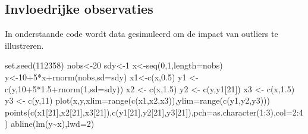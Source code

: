 \documentclass[
  dutch,
  letterpaper,
  12pt]{book}
\newenvironment{Shaded}{\begin{snugshade}}{\end{snugshade}}
\newcommand{\AttributeTok}[1]{\textcolor[rgb]{0.40,0.45,0.13}{#1}}
\newcommand{\DecValTok}[1]{\textcolor[rgb]{0.68,0.00,0.00}{#1}}
\newcommand{\FloatTok}[1]{\textcolor[rgb]{0.68,0.00,0.00}{#1}}
\newcommand{\FunctionTok}[1]{\textcolor[rgb]{0.28,0.35,0.67}{#1}}
\newcommand{\NormalTok}[1]{\textcolor[rgb]{0.00,0.23,0.31}{#1}}
\newcommand{\OtherTok}[1]{\textcolor[rgb]{0.00,0.23,0.31}{#1}}
\newcommand{\SpecialCharTok}[1]{\textcolor[rgb]{0.37,0.37,0.37}{#1}}
\theoremstyle{definition}
\theoremstyle{definition}
\theoremstyle{definition}
\theoremstyle{remark}
\begin{document}
\subsection{Invloedrijke observaties}\label{invloedrijke-observaties}

In onderstaande code wordt data gesimuleerd om de impact van outliers te
illustreren.

\begin{Shaded}
\begin{Highlighting}[]
\FunctionTok{set.seed}\NormalTok{(}\DecValTok{112358}\NormalTok{)}
\NormalTok{nobs}\OtherTok{\textless{}{-}}\DecValTok{20}
\NormalTok{sdy}\OtherTok{\textless{}{-}}\DecValTok{1}
\NormalTok{x}\OtherTok{\textless{}{-}}\FunctionTok{seq}\NormalTok{(}\DecValTok{0}\NormalTok{,}\DecValTok{1}\NormalTok{,}\AttributeTok{length=}\NormalTok{nobs)}
\NormalTok{y}\OtherTok{\textless{}{-}}\DecValTok{10}\SpecialCharTok{+}\DecValTok{5}\SpecialCharTok{*}\NormalTok{x}\SpecialCharTok{+}\FunctionTok{rnorm}\NormalTok{(nobs,}\AttributeTok{sd=}\NormalTok{sdy)}
\NormalTok{x1}\OtherTok{\textless{}{-}}\FunctionTok{c}\NormalTok{(x,}\FloatTok{0.5}\NormalTok{)}
\NormalTok{y1 }\OtherTok{\textless{}{-}} \FunctionTok{c}\NormalTok{(y,}\DecValTok{10}\SpecialCharTok{+}\DecValTok{5}\SpecialCharTok{*}\FloatTok{1.5}\SpecialCharTok{+}\FunctionTok{rnorm}\NormalTok{(}\DecValTok{1}\NormalTok{,}\AttributeTok{sd=}\NormalTok{sdy))}
\NormalTok{x2 }\OtherTok{\textless{}{-}} \FunctionTok{c}\NormalTok{(x,}\FloatTok{1.5}\NormalTok{)}
\NormalTok{y2 }\OtherTok{\textless{}{-}} \FunctionTok{c}\NormalTok{(y,y1[}\DecValTok{21}\NormalTok{])}
\NormalTok{x3 }\OtherTok{\textless{}{-}} \FunctionTok{c}\NormalTok{(x,}\FloatTok{1.5}\NormalTok{)}
\NormalTok{y3 }\OtherTok{\textless{}{-}} \FunctionTok{c}\NormalTok{(y,}\DecValTok{11}\NormalTok{)}
\FunctionTok{plot}\NormalTok{(x,y,}\AttributeTok{xlim=}\FunctionTok{range}\NormalTok{(}\FunctionTok{c}\NormalTok{(x1,x2,x3)),}\AttributeTok{ylim=}\FunctionTok{range}\NormalTok{(}\FunctionTok{c}\NormalTok{(y1,y2,y3)))}
\FunctionTok{points}\NormalTok{(}\FunctionTok{c}\NormalTok{(x1[}\DecValTok{21}\NormalTok{],x2[}\DecValTok{21}\NormalTok{],x3[}\DecValTok{21}\NormalTok{]),}\FunctionTok{c}\NormalTok{(y1[}\DecValTok{21}\NormalTok{],y2[}\DecValTok{21}\NormalTok{],y3[}\DecValTok{21}\NormalTok{]),}\AttributeTok{pch=}\FunctionTok{as.character}\NormalTok{(}\DecValTok{1}\SpecialCharTok{:}\DecValTok{3}\NormalTok{),}\AttributeTok{col=}\DecValTok{2}\SpecialCharTok{:}\DecValTok{4}\NormalTok{)}
\FunctionTok{abline}\NormalTok{(}\FunctionTok{lm}\NormalTok{(y}\SpecialCharTok{\textasciitilde{}}\NormalTok{x),}\AttributeTok{lwd=}\DecValTok{2}\NormalTok{)}

\end{Highlighting}
\end{Shaded}
\end{document}
